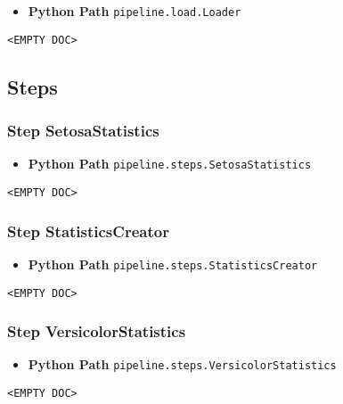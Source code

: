 \begin{itemize}
\tightlist
\item
  \textbf{Python Path} \texttt{pipeline.load.Loader}
\end{itemize}

\texttt{\textless{}EMPTY\ DOC\textgreater{}}

\subsection{Steps}\label{steps}

\subsubsection{\texorpdfstring{Step
\textbf{SetosaStatistics}}{Step SetosaStatistics}}\label{step-setosastatistics}

\begin{itemize}
\tightlist
\item
  \textbf{Python Path} \texttt{pipeline.steps.SetosaStatistics}
\end{itemize}

\texttt{\textless{}EMPTY\ DOC\textgreater{}}

\subsubsection{\texorpdfstring{Step
\textbf{StatisticsCreator}}{Step StatisticsCreator}}\label{step-statisticscreator}

\begin{itemize}
\tightlist
\item
  \textbf{Python Path} \texttt{pipeline.steps.StatisticsCreator}
\end{itemize}

\texttt{\textless{}EMPTY\ DOC\textgreater{}}

\subsubsection{\texorpdfstring{Step
\textbf{VersicolorStatistics}}{Step VersicolorStatistics}}\label{step-versicolorstatistics}

\begin{itemize}
\tightlist
\item
  \textbf{Python Path} \texttt{pipeline.steps.VersicolorStatistics}
\end{itemize}

\texttt{\textless{}EMPTY\ DOC\textgreater{}}

